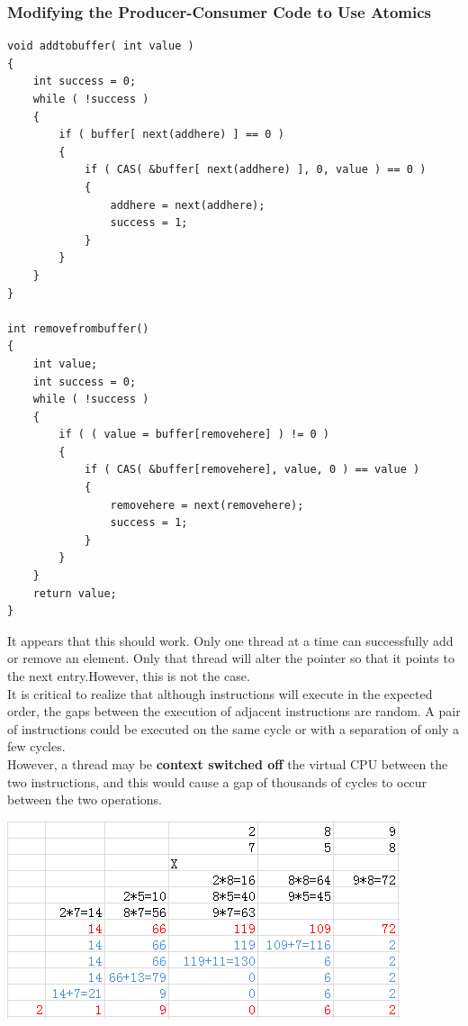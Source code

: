 \documentclass[12pt,a4paper]{report}
\begin{document}
\subsubsection*{Modifying the Producer-Consumer Code to Use Atomics}
\begin{lstlisting}
void addtobuffer( int value )
{
	int success = 0;
	while ( !success )
	{
		if ( buffer[ next(addhere) ] == 0 )
		{
			if ( CAS( &buffer[ next(addhere) ], 0, value ) == 0 )
			{
				addhere = next(addhere);
				success = 1;
			}
		}
	}
}

int removefrombuffer()
{
	int value;
	int success = 0;
	while ( !success )
	{
		if ( ( value = buffer[removehere] ) != 0 )
		{
			if ( CAS( &buffer[removehere], value, 0 ) == value )
			{
				removehere = next(removehere);
				success = 1;
			}
		}
	}
	return value;
}

\end{lstlisting}
It appears that this should work. Only one thread at a time can successfully add or remove an element. Only that thread will alter the pointer so that it points to the next entry.However, this is not the case.
\\
It is critical to realize that although instructions will execute in the expected order, the gaps between the execution of adjacent instructions are random. A pair of instructions could be executed on the same cycle or with a separation of only a few cycles.
\\
However, a thread may be \textbf{context switched off} the virtual CPU between the two instructions, and this would cause a gap of thousands of cycles to occur between the two operations.
\\
\begin{center}
	\includegraphics{0043.png}
\end{center}
\end{document}
